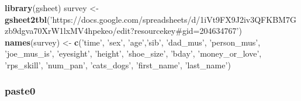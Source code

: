 \documentclass[
]{book}
\newenvironment{Shaded}{\begin{snugshade}}{\end{snugshade}}
\newcommand{\CommentTok}[1]{\textcolor[rgb]{0.56,0.35,0.01}{\textit{#1}}}
\newcommand{\DataTypeTok}[1]{\textcolor[rgb]{0.13,0.29,0.53}{#1}}
\newcommand{\KeywordTok}[1]{\textcolor[rgb]{0.13,0.29,0.53}{\textbf{#1}}}
\newcommand{\NormalTok}[1]{#1}
\newcommand{\OperatorTok}[1]{\textcolor[rgb]{0.81,0.36,0.00}{\textbf{#1}}}
\newcommand{\StringTok}[1]{\textcolor[rgb]{0.31,0.60,0.02}{#1}}
\begin{document}
\begin{Shaded}
\begin{Highlighting}[]
\KeywordTok{library}\NormalTok{(gsheet)}
\NormalTok{survey <-}\StringTok{ }\KeywordTok{gsheet2tbl}\NormalTok{(}\StringTok{'https://docs.google.com/spreadsheets/d/1iVt9FX9J2iv3QFKBM7Gzb9dgva70XrW1lxMV4hpekeo/edit?resourcekey#gid=204634767'}\NormalTok{)}
\KeywordTok{names}\NormalTok{(survey) <-}\StringTok{ }\KeywordTok{c}\NormalTok{(}\StringTok{'time'}\NormalTok{, }\StringTok{'sex'}\NormalTok{, }\StringTok{'age'}\NormalTok{,}\StringTok{'sib'}\NormalTok{, }\StringTok{'dad_mus'}\NormalTok{, }\StringTok{'person_mus'}\NormalTok{, }\StringTok{'joe_mus_is'}\NormalTok{, }\StringTok{'eyesight'}\NormalTok{, }\StringTok{'height'}\NormalTok{, }\StringTok{'shoe_size'}\NormalTok{, }\StringTok{'bday'}\NormalTok{, }\StringTok{'money_or_love'}\NormalTok{, }\StringTok{'rps_skill'}\NormalTok{, }\StringTok{'num_pan'}\NormalTok{, }\StringTok{'cats_dogs'}\NormalTok{, }\StringTok{'first_name'}\NormalTok{, }\StringTok{'last_name'}\NormalTok{)}
\end{Highlighting}
\end{Shaded}

\hypertarget{paste0}{%
\subsubsection*{paste0}\label{paste0}}

\begin{Shaded}
\end{Shaded}
\end{document}
